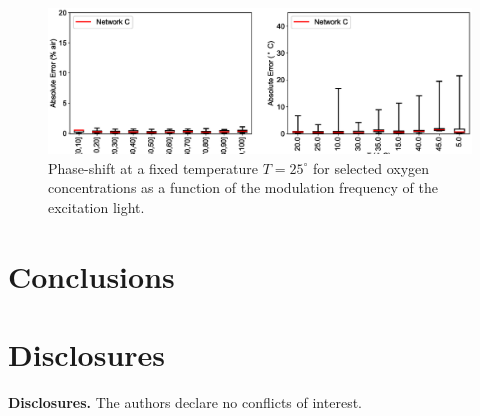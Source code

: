 \documentclass[9pt,twocolumn,twoside,pdftex]{optica}
\begin{document}
\begin{figure}[htbp]
\centering
\includegraphics[width=9 cm]{result_theta_theta0.eps}
\caption{Phase-shift at a fixed temperature $T=25 ^{\circ}$ for selected oxygen concentrations as a function of the modulation frequency of the excitation light.}
\label{fig:result_theta0}
\end{figure}







\section{Conclusions}






\section*{Disclosures}

\medskip

\noindent\textbf{Disclosures.} The authors declare no conflicts of interest.






\end{document}
